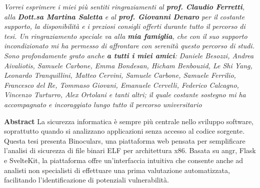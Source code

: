 \documentclass[12pt, a4paper, oneside]{report}
\begin{document}
    
    \thispagestyle{empty}
    \vspace*{\fill}
    \vspace*{-4.5cm}
    \begin{Center}
        \begin{minipage}{\textwidth}
            \centering
            \itshape
            Vorrei esprimere i miei più sentiti ringraziamenti al \textbf{prof. Claudio Ferretti}, alla \textbf{Dott.sa Martina Saletta} e al \textbf{prof. Giovanni Denaro} per il costante supporto, la disponibilità e i preziosi consigli offerti durante tutto il percorso di tesi.
            \newline \vspace*{1.5em}
            Un ringraziamento speciale va alla \textbf{mia famiglia}, che con il suo supporto incondizionato mi ha permesso di affrontare con serenità questo percorso di studi. \newline \vspace*{1.5em}
            Sono profondamente grato anche \textbf{a tutti i miei amici}: Daniele Besozzi, Andrea Aivaliotis, Samuele Carbone, Emma Bondesan, Hicham Benbouzid, Le Shi Yang, Leonardo Tranquillini, Matteo Cervini, Samuele Carbone, Samuele Ferrilio, Francesco del Re, Tommaso Giovani, Emanuele Cervelli, Federico Calcagno, Vincenzo Turturro, Alex Ortolani e tanti altri; il quale costante sostegno mi ha accompagnato e incoraggiato lungo tutto il percorso universitario
        \end{minipage}
    \end{Center}
    \vspace*{\fill}
    \newpage
    \clearpage
    \thispagestyle{empty}
    \vspace*{\fill}
    \vspace*{-4cm}
    \begin{Center}
        \begin{minipage}{\textwidth}
            \centering
            \textbf{Abstract} \newline
            La sicurezza informatica è sempre più centrale nello sviluppo software, soprattutto quando si analizzano applicazioni senza accesso al codice sorgente. Questa tesi presenta Binoculars, una piattaforma web pensata per semplificare l’analisi di sicurezza di file binari ELF per architettura x86. Basata su angr, Flask e SvelteKit, la piattaforma offre un’interfaccia intuitiva che consente anche ad analisti non specialisti di effettuare una prima valutazione automatizzata, facilitando l’identificazione di potenziali vulnerabilità.
        \end{minipage}
    \end{Center}
    \vspace*{\fill}
    \addtocounter{page}{-2}
\end{document}
